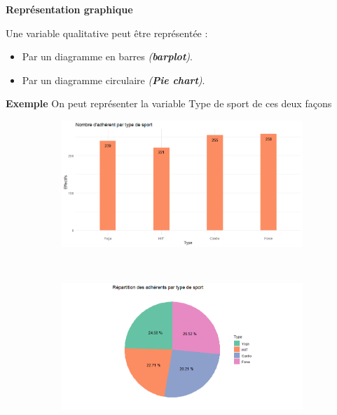 \documentclass[aspectratio=169,xcolor=dvipsnames]{beamer}
\begin{document}
\begin{frame}
	\begin{block}{\textbf{Représentation graphique}}
	\begin{small}
	Une variable qualitative peut être représentée :
		\begin{itemize}
		\item Par un diagramme en barres \emph{(\textbf{barplot})}.
		\item Par un diagramme circulaire \emph{(\textbf{Pie chart})}.
		\end{itemize}
	\end{small}
	\end{block}
	
	\begin{exampleblock}{\textbf{Exemple}}
	{\small On peut représenter la variable \og Type de sport \fg{} de ces deux façons}
		\begin{figure}
		\centering
		\begin{subfigure}{0.48\textwidth}
		\includegraphics[width=\textwidth]{barplot_gym2.png}
		\end{subfigure}~
		\begin{subfigure}{0.48\textwidth}
		\includegraphics[width=\textwidth]{piechart_gym1.png}
		\end{subfigure}
		\end{figure}			
	\end{exampleblock}
\end{frame}
\end{document}
